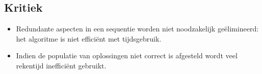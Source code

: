 \subsection{Kritiek}
\begin{itemize}
 \item Redundante aspecten in een sequentie worden niet noodzakelijk ge\"elimineerd: het algoritme is niet effici\"ent met tijdsgebruik.
 \item Indien de populatie van oplossingen niet correct is afgesteld wordt veel rekentijd ineffici\"ent gebruikt.
\end{itemize}